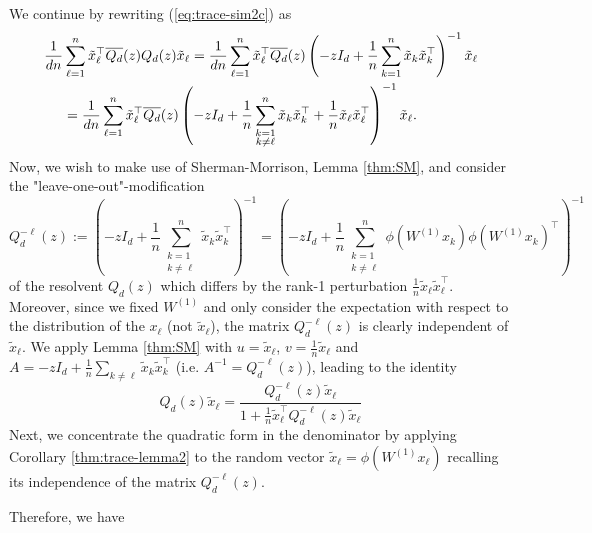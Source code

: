 \documentclass{article}
\begin{document}
We continue by rewriting (\ref{eq:trace-sim2c}) as
\begin{align}
\frac{1}{dn}&\sum_{\ell=1}^n \tilde{x}_\ell^\top\overline{Q_{d}}(z)Q_{d}(z)\tilde{x}_\ell = \frac{1}{dn}\sum_{\ell=1}^n \tilde{x}_\ell^\top\overline{Q_{d}}(z)\left(-zI_{d}+\frac{1}{n}\sum_{k=1}^n \tilde{x}_k \tilde{x}_k^\top\right)^{-1}\tilde{x}_\ell \notag
\\&= \frac{1}{dn}\sum_{\ell=1}^n \tilde{x}_\ell^\top\overline{Q_{d}}(z)\left(-zI_{d}+\frac{1}{n}\sum_{\substack{k=1 \\ k\neq\ell}}^n \tilde{x}_k\tilde{x}_k^\top+\frac{1}{n} \tilde{x}_\ell \tilde{x}_\ell^\top\right)^{-1}\tilde{x}_\ell.
\end{align}
Now, we wish to make use of Sherman-Morrison, Lemma \ref{thm:SM}, and consider the "leave-one-out"-modification
\begin{equation}
Q_{d}^{-\ell}(z):=\left(-zI_{d} + \frac{1}{n}\sum_{\substack{k=1 \\ k\neq\ell}}^n \tilde{x}_k\tilde{x}_k^\top\right)^{-1}=\left(-zI_d + \frac{1}{n}\sum_{\substack{k=1 \\ k\neq\ell}}^n\phi(W^{(1)}x_k)\phi(W^{(1)}x_k)^\top\right)^{-1}
\end{equation}
of the resolvent $Q_{d}(z)$ which differs by the rank-1 perturbation $\frac{1}{n}\tilde{x}_\ell \tilde{x}_\ell^\top$. Moreover, since we fixed $W^{(1)}$ and only consider the expectation with respect to the distribution of the $x_\ell$ (not $\tilde{x}_\ell$), the matrix $Q_{d}^{-\ell}(z)$ is clearly independent of $\tilde{x}_\ell$. We apply Lemma \ref{thm:SM} with $u=\tilde{x}_\ell$, $v=\frac{1}{n}\tilde{x}_\ell$ and $A=-zI_{d}+\frac{1}{n}\sum\limits_{k\neq\ell}\tilde{x}_k\tilde{x}_k^\top$ (i.e. $A^{-1}=Q_{d}^{-\ell}(z)$), leading to the identity
\begin{equation}
Q_{d}(z)\tilde{x}_\ell = \frac{Q_{d}^{-\ell}(z)\tilde{x}_\ell}{1+\frac{1}{n}\tilde{x}_\ell^\top Q_{d}^{-\ell}(z)\tilde{x}_\ell}
\end{equation}
Next, we concentrate the quadratic form in the denominator by applying Corollary \ref{thm:trace-lemma2} to the random vector $\tilde{x}_\ell=\phi(W^{(1)}x_\ell)$ recalling its independence of the matrix $Q_{d}^{-\ell}(z)$.
\bigskip
\par
Therefore, we have
\end{document}

